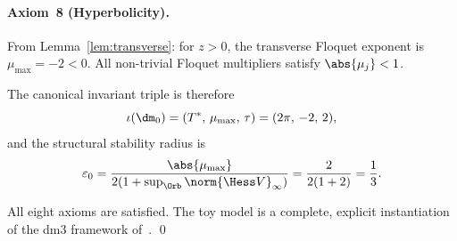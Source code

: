 \paragraph{Axiom~8 (Hyperbolicity).}
From Lemma~\ref{lem:transverse}: for $z>0$, the transverse
Floquet exponent is $\mu_{\max}=-2<0$. All non-trivial Floquet
multipliers satisfy $\abs{\mu_j}<1$.

\medskip

The canonical invariant triple is therefore
\[
  \iota(\dm_0) = (T^*,\,\mu_{\max},\,\tau)
  = (2\pi,\,-2,\,2),
\]
and the structural stability radius is
\[
  \varepsilon_0
  = \frac{\abs{\mu_{\max}}}{2(1+\sup_\Orb\norm{\Hess V}_\infty)}
  = \frac{2}{2(1+2)}
  = \frac{1}{3}.
\]

All eight axioms are satisfied. The toy model is a complete, explicit
instantiation of the dm3 framework of~\cite{Paper1}. \qed
